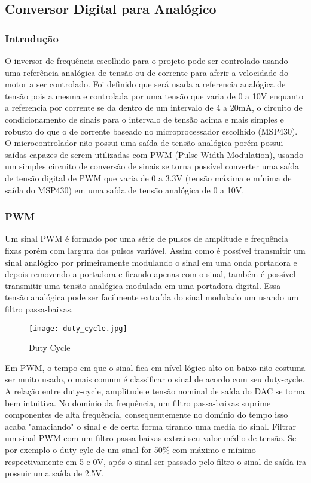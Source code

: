 \subsection{Conversor Digital para Analógico}
\subsubsection{Introdução}
O inversor de frequência escolhido para o projeto pode ser controlado usando uma referência analógica de tensão ou de corrente para aferir a velocidade do motor a ser controlado. Foi definido que será usada a referencia analógica de tensão pois a mesma e controlada por uma tensão que varia de 0 a 10V enquanto a referencia por corrente se da dentro de um intervalo de 4 a 20mA, o circuito de condicionamento de sinais para o intervalo de tensão acima e mais simples e robusto do que o de corrente baseado no microprocessador escolhido (MSP430). O microcontrolador não possui uma saída de tensão analógica porém possui saídas capazes de serem utilizadas com PWM (Pulse Width Modulation), usando um simples circuito de conversão de sinais se torna possível converter uma saída de tensão digital de PWM que varia de 0 a 3.3V (tensão máxima e mínima de saída do MSP430) em uma saída de tensão analógica de 0 a 10V.
\subsubsection{PWM}
Um sinal PWM é formado por uma série de pulsos de amplitude e frequência fixas porém com largura dos pulsos variável. Assim como é possível transmitir um sinal analógico por primeiramente modulando o sinal em uma onda portadora e depois removendo a portadora e ficando apenas com o sinal, também é possível transmitir uma tensão analógica modulada em uma portadora digital. Essa tensão analógica pode ser facilmente extraída do sinal modulado um usando um filtro passa-baixas.
\begin{figure}[htbp]
	\centering
	\texttt{[image: duty\_cycle.jpg]}
	\caption{Duty Cycle}
	\label{duty_cycle}
\end{figure}
Em PWM, o tempo em que o sinal fica em nível lógico alto ou baixo não costuma ser muito usado, o mais comum é classificar o sinal de acordo com seu duty-cycle. A relação entre duty-cycle, amplitude e tensão nominal de saída do DAC se torna bem intuitiva. No domínio da frequência, um filtro passa-baixas suprime componentes de alta frequência, consequentemente no domínio do tempo isso acaba "amaciando" o sinal e de certa forma tirando uma media do sinal. Filtrar um sinal PWM com um filtro passa-baixas extrai seu valor médio de tensão. Se por exemplo o duty-cyle de um sinal for 50\% com máximo e mínimo respectivamente em 5 e 0V, após o sinal ser passado pelo filtro o sinal de saída ira possuir uma saída de 2.5V.

